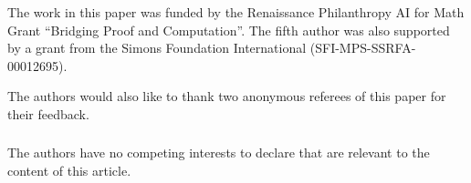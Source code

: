 \documentclass[runningheads]{llncs}
\begin{document}
\begin{credits}
  \subsubsection{\ackname} The work in this paper was funded by the Renaissance Philanthropy AI for Math Grant ``Bridging Proof and Computation''. The fifth author was also supported by a grant from the Simons Foundation International (SFI-MPS-SSRFA-00012695).

  The authors would also like to thank two anonymous referees of this paper for their feedback.


\subsubsection{\discintname}
The authors have no competing interests to declare that are
relevant to the content of this article.
\end{credits}
%
%
%


\newpage
\end{document}
